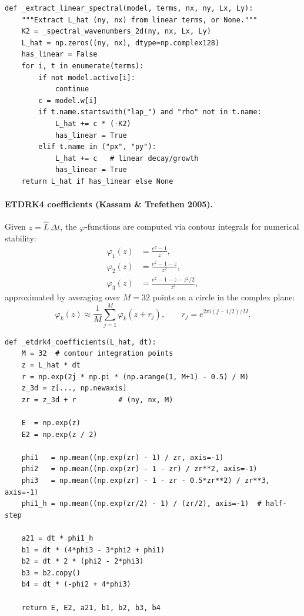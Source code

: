 \documentclass[11pt]{article}
\begin{document}
\begin{lstlisting}[caption={multifield.py --- extracting $\hat{L}$ for ETDRK4}]
def _extract_linear_spectral(model, terms, nx, ny, Lx, Ly):
    """Extract L_hat (ny, nx) from linear terms, or None."""
    K2 = _spectral_wavenumbers_2d(ny, nx, Lx, Ly)
    L_hat = np.zeros((ny, nx), dtype=np.complex128)
    has_linear = False
    for i, t in enumerate(terms):
        if not model.active[i]:
            continue
        c = model.w[i]
        if t.name.startswith("lap_") and "rho" not in t.name:
            L_hat += c * (-K2)
            has_linear = True
        elif t.name in ("px", "py"):
            L_hat += c   # linear decay/growth
            has_linear = True
    return L_hat if has_linear else None
\end{lstlisting}


\paragraph{ETDRK4 coefficients (Kassam \& Trefethen 2005).}
Given $z = \hat{L}\,\Delta t$, the $\varphi$-functions are computed via
contour integrals for numerical stability:
\begin{align}
  \varphi_1(z) &= \frac{e^z - 1}{z}, \\
  \varphi_2(z) &= \frac{e^z - 1 - z}{z^2}, \\
  \varphi_3(z) &= \frac{e^z - 1 - z - z^2/2}{z^3},
\end{align}
approximated by averaging over $M = 32$ points on a circle in the
complex plane:
\begin{equation}
  \varphi_k(z) \approx \frac{1}{M}\sum_{j=1}^M \varphi_k(z + r_j),
  \qquad
  r_j = e^{2\pi i(j-1/2)/M}.
\end{equation}

\begin{lstlisting}[caption={multifield.py --- ETDRK4 coefficient computation}]
def _etdrk4_coefficients(L_hat, dt):
    M = 32  # contour integration points
    z = L_hat * dt
    r = np.exp(2j * np.pi * (np.arange(1, M+1) - 0.5) / M)
    z_3d = z[..., np.newaxis]
    zr = z_3d + r          # (ny, nx, M)

    E  = np.exp(z)
    E2 = np.exp(z / 2)

    phi1   = np.mean((np.exp(zr) - 1) / zr, axis=-1)
    phi2   = np.mean((np.exp(zr) - 1 - zr) / zr**2, axis=-1)
    phi3   = np.mean((np.exp(zr) - 1 - zr - 0.5*zr**2) / zr**3, axis=-1)
    phi1_h = np.mean((np.exp(zr/2) - 1) / (zr/2), axis=-1)  # half-step

    a21 = dt * phi1_h
    b1 = dt * (4*phi3 - 3*phi2 + phi1)
    b2 = dt * 2 * (phi2 - 2*phi3)
    b3 = b2.copy()
    b4 = dt * (-phi2 + 4*phi3)

    return E, E2, a21, b1, b2, b3, b4
\end{lstlisting}
\end{document}
